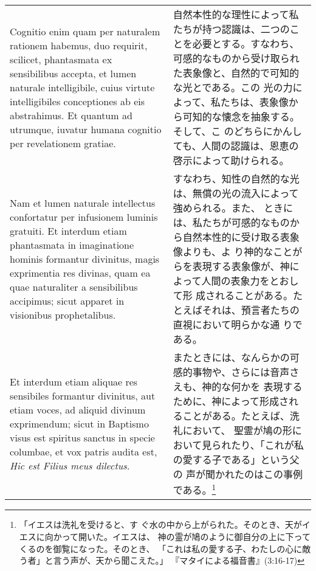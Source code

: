 \documentclass[10pt]{jsarticle} %
\begin{document}
\begin{longtable}{p{21em}p{21em}}
\\

Cognitio enim quam per naturalem rationem habemus, duo requirit,
scilicet, phantasmata ex sensibilibus accepta, et lumen naturale
intelligibile, cuius virtute intelligibiles conceptiones ab eis
abstrahimus. Et quantum ad utrumque, iuvatur humana cognitio per
revelationem gratiae.

&

自然本性的な理性によって私たちが持つ認識は、二つのことを必要とする。すなわち、
可感的なものから受け取られた表象像と、自然的で可知的な光とである。この
光の力によって、私たちは、表象像から可知的な懐念を抽象する。そして、こ
のどちらにかんしても、人間の認識は、恩恵の啓示によって助けられる。

\\

Nam et lumen naturale intellectus confortatur per infusionem luminis
gratuiti. Et interdum etiam phantasmata in imaginatione hominis
formantur divinitus, magis exprimentia res divinas, quam ea quae
naturaliter a sensibilibus accipimus; sicut apparet in visionibus
prophetalibus.

&

すなわち、知性の自然的な光は、無償の光の流入によって強められる。また、
ときには、私たちが可感的なものから自然本性的に受け取る表象像よりも、よ
り神的なことがらを表現する表象像が、神によって人間の表象力をとおして形
成されることがある。たとえばそれは、預言者たちの直視において明らかな通
りである。

\\

Et interdum etiam aliquae res sensibiles formantur divinitus, aut
etiam voces, ad aliquid divinum exprimendum; sicut in Baptismo visus
est spiritus sanctus in specie columbae, et vox patris audita est,
{\it Hic est Filius meus dilectus}.

&

またときには、なんらかの可感的事物や、さらには音声さえも、神的な何かを
表現するために、神によって形成されることがある。たとえば、洗礼において、
聖霊が鳩の形において見られたり、「これが私の愛する子である」という父の
声が聞かれたのはこの事例である。\footnote{「イエスは洗礼を受けると、す
ぐ水の中から上がられた。そのとき、天がイエスに向かって開いた。イエスは、
神の霊が鳩のように御自分の上に下ってくるのを御覧になった。そのとき、
「これは私の愛する子、わたしの心に敵う者」と言う声が、天から聞こえた。」
『マタイによる福音書』(3:16-17)}

\\


\end{longtable}
\end{document}
